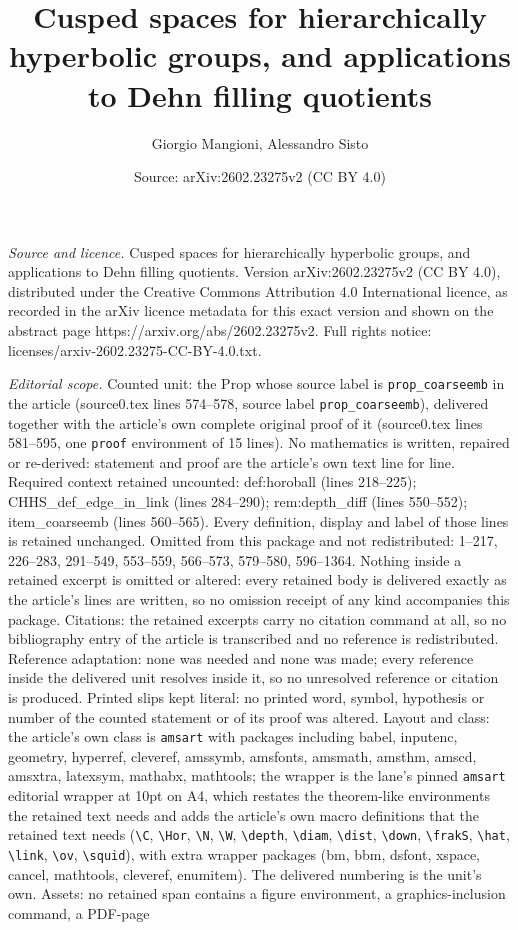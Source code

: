 \documentclass[10pt,a4paper]{amsart}
\title[Cusped spaces for hierarchically hyperbolic groups, and appl]{Cusped spaces for hierarchically hyperbolic groups, and applications to Dehn filling quotients}
\author{Giorgio Mangioni, Alessandro Sisto}
\date{Source: arXiv:2602.23275v2 (CC BY 4.0)}
\begin{document}
\maketitle

\noindent\emph{Source and licence.} Cusped spaces for hierarchically hyperbolic groups, and applications to Dehn filling quotients. Version arXiv:2602.23275v2 (CC BY 4.0), distributed under the Creative Commons Attribution 4.0 International licence, as recorded in the arXiv licence metadata for this exact version and shown on the abstract page https://arxiv.org/abs/2602.23275v2. Full rights notice: licenses/arxiv-2602.23275-CC-BY-4.0.txt.\par\smallskip

\noindent\textit{Editorial scope.} Counted unit: the Prop whose source label is \texttt{prop\_coarseemb} in the article (source0.tex lines 574--578, source label \texttt{prop\_coarseemb}), delivered together with the article's own complete original proof of it (source0.tex lines 581--595, one \texttt{proof} environment of 15 lines). No mathematics is written, repaired or re-derived: statement and proof are the article's own text line for line. Required context retained uncounted: def:horoball (lines 218--225); CHHS\_def\_edge\_in\_link (lines 284--290); rem:depth\_diff (lines 550--552); item\_coarseemb (lines 560--565). Every definition, display and label of those lines is retained unchanged. Omitted from this package and not redistributed: 1--217, 226--283, 291--549, 553--559, 566--573, 579--580, 596--1364. Nothing inside a retained excerpt is omitted or altered: every retained body is delivered exactly as the article's lines are written, so no omission receipt of any kind accompanies this package. Citations: the retained excerpts carry no citation command at all, so no bibliography entry of the article is transcribed and no reference is redistributed. Reference adaptation: none was needed and none was made; every reference inside the delivered unit resolves inside it, so no unresolved reference or citation is produced. Printed slips kept literal: no printed word, symbol, hypothesis or number of the counted statement or of its proof was altered. Layout and class: the article's own class is \texttt{amsart} with packages including babel, inputenc, geometry, hyperref, cleveref, amssymb, amsfonts, amsmath, amsthm, amscd, amsxtra, latexsym, mathabx, mathtools; the wrapper is the lane's pinned \texttt{amsart} editorial wrapper at 10pt on A4, which restates the theorem-like environments the retained text needs and adds the article's own macro definitions that the retained text needs (\texttt{\textbackslash C}, \texttt{\textbackslash Hor}, \texttt{\textbackslash N}, \texttt{\textbackslash W}, \texttt{\textbackslash depth}, \texttt{\textbackslash diam}, \texttt{\textbackslash dist}, \texttt{\textbackslash down}, \texttt{\textbackslash frakS}, \texttt{\textbackslash hat}, \texttt{\textbackslash link}, \texttt{\textbackslash ov}, \texttt{\textbackslash squid}), with extra wrapper packages (bm, bbm, dsfont, xspace, cancel, mathtools, cleveref, enumitem). The delivered numbering is the unit's own. Assets: no retained span contains a figure environment, a graphics-inclusion command, a PDF-page 
\end{document}
